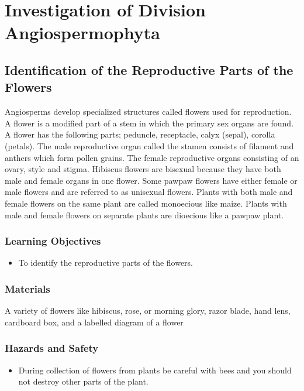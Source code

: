 \section{Investigation of Division Angiospermophyta}

\subsection{Identification of the Reproductive Parts of the Flowers}
Angiosperms develop specialized structures called flowers used for reproduction. A flower is a modified part of a stem in which the primary sex organs are found. A flower has the following parts; peduncle, receptacle, calyx (sepal), corolla (petals). The male reproductive organ called the stamen consists of filament and anthers which form pollen grains. The female reproductive organs consisting of an ovary, style and stigma. Hibiscus flowers are bisexual because they have both male and female organs in one flower. Some pawpaw flowers have either female or male flowers and are referred to as unisexual flowers. Plants with both male and female flowers on the same plant are called monoecious like maize. Plants with male and female flowers on separate plants are dioecious like a pawpaw plant.

\subsubsection*{Learning Objectives}
\begin{itemize}
\item{To identify the reproductive parts of the flowers.}
\end{itemize}

\subsubsection*{Materials}
A variety of flowers like hibiscus, rose, or morning glory, razor blade, hand lens, cardboard box, and a labelled diagram of a flower

\subsubsection*{Hazards and Safety}
\begin{itemize}
\item{During collection of flowers from plants be careful with bees and you should not destroy other parts of the plant.}
\end{itemize}

